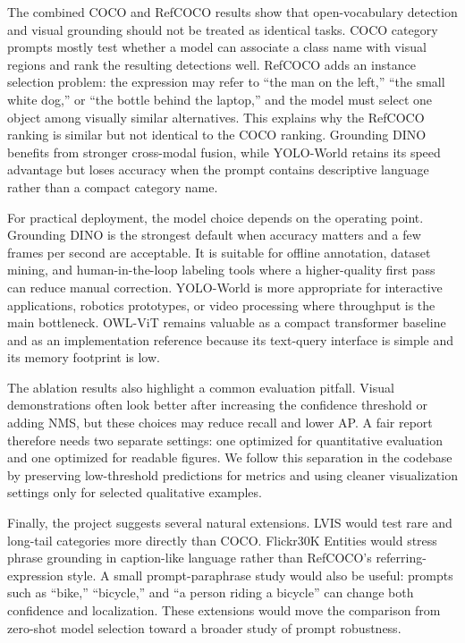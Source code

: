 \documentclass[conference]{IEEEtran}
\begin{document}
The combined COCO and RefCOCO results show that open-vocabulary detection and
visual grounding should not be treated as identical tasks. COCO category
prompts mostly test whether a model can associate a class name with visual
regions and rank the resulting detections well. RefCOCO adds an instance
selection problem: the expression may refer to ``the man on the left,'' ``the
small white dog,'' or ``the bottle behind the laptop,'' and the model must
select one object among visually similar alternatives. This explains why the
RefCOCO ranking is similar but not identical to the COCO ranking. Grounding
DINO benefits from stronger cross-modal fusion, while YOLO-World retains its
speed advantage but loses accuracy when the prompt contains descriptive
language rather than a compact category name.

For practical deployment, the model choice depends on the operating point.
Grounding DINO is the strongest default when accuracy matters and a few frames
per second are acceptable. It is suitable for offline annotation, dataset
mining, and human-in-the-loop labeling tools where a higher-quality first pass
can reduce manual correction. YOLO-World is more appropriate for interactive
applications, robotics prototypes, or video processing where throughput is the
main bottleneck. OWL-ViT remains valuable as a compact transformer baseline and
as an implementation reference because its text-query interface is simple and
its memory footprint is low.

The ablation results also highlight a common evaluation pitfall. Visual
demonstrations often look better after increasing the confidence threshold or
adding NMS, but these choices may reduce recall and lower AP. A fair report
therefore needs two separate settings: one optimized for quantitative
evaluation and one optimized for readable figures. We follow this separation in
the codebase by preserving low-threshold predictions for metrics and using
cleaner visualization settings only for selected qualitative examples.

Finally, the project suggests several natural extensions. LVIS would test rare
and long-tail categories more directly than COCO. Flickr30K Entities would
stress phrase grounding in caption-like language rather than RefCOCO's
referring-expression style. A small prompt-paraphrase study would also be
useful: prompts such as ``bike,'' ``bicycle,'' and ``a person riding a
bicycle'' can change both confidence and localization. These extensions would
move the comparison from zero-shot model selection toward a broader study of
prompt robustness.
\end{document}
